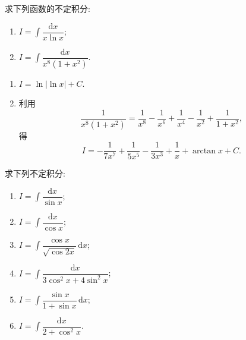 \begin{example}
    求下列函数的不定积分:
    \begin{enumerate}
        \item $\displaystyle I=\int\dfrac{\mathrm{d}x}{x\ln x}$;
        \item $\displaystyle I=\int\dfrac{\mathrm{d}x}{x^8(1+x^2)}$.
    \end{enumerate}
\end{example}
\exampleblank

\begin{solution}
    \leavevmode
    \begin{enumerate}
        \item $\displaystyle I=\ln|\ln x|+C$.
        \item 利用
              \[
                  \dfrac{1}{x^8(1+x^2)}
                  =\dfrac{1}{x^8}-\dfrac{1}{x^6}+\dfrac{1}{x^4}-\dfrac{1}{x^2}+\dfrac{1}{1+x^2},
              \]
              得
              \[
                  I=-\dfrac{1}{7x^7}+\dfrac{1}{5x^5}-\dfrac{1}{3x^3}
                  +\dfrac{1}{x}+\arctan x+C.
              \]
    \end{enumerate}
\end{solution}

\begin{example}
    求下列不定积分:
    \begin{enumerate}
        \item $\displaystyle I=\int\dfrac{\mathrm{d}x}{\sin x}$;
        \item $\displaystyle I=\int\dfrac{\mathrm{d}x}{\cos x}$;
        \item $\displaystyle I=\int\dfrac{\cos x}{\sqrt{\cos2x}}\,\mathrm{d}x$;
        \item $\displaystyle I=\int\dfrac{\mathrm{d}x}{3\cos^2x+4\sin^2x}$;
        \item $\displaystyle I=\int\dfrac{\sin x}{1+\sin x}\,\mathrm{d}x$;
        \item $\displaystyle I=\int\dfrac{\mathrm{d}x}{2+\cos^2x}$.
    \end{enumerate}
\end{example}
\exampleblank

